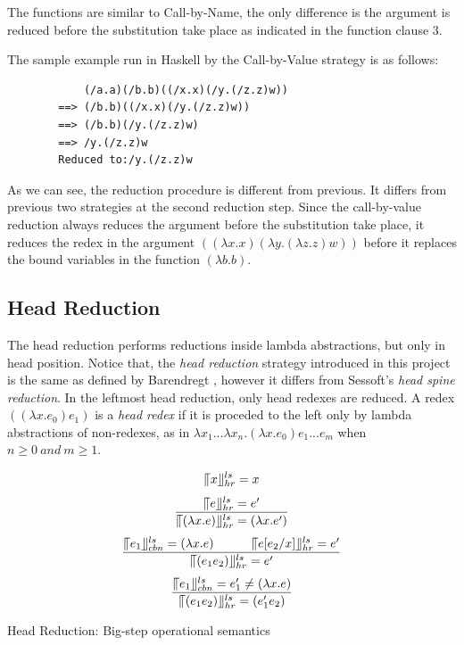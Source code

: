 \documentclass[a4paper,11pt,twoside]{report}
\begin{document}
The functions are similar to Call-by-Name, the only difference is the argument is reduced before the substitution take place as indicated in the function clause 3.

The sample example run in Haskell by the Call-by-Value strategy is as follows:

\begin{verbatim}
            (/a.a)(/b.b)((/x.x)(/y.(/z.z)w))
        ==> (/b.b)((/x.x)(/y.(/z.z)w))
        ==> (/b.b)(/y.(/z.z)w)
        ==> /y.(/z.z)w
        Reduced to:/y.(/z.z)w
\end{verbatim}

As we can see, the reduction procedure is different from previous. It differs from previous two strategies at the second reduction step. Since the call-by-value reduction always reduces the argument before the substitution take place, it reduces the redex in the argument $((\lambda x.x)(\lambda y.(\lambda z.z)w))$ before it replaces the bound variables in the function $(\lambda b.b)$.    


\subsection{Head Reduction}

The head reduction performs reductions inside lambda abstractions, but only in head position. Notice that, the \textit{head reduction} strategy introduced in this project is the same as defined by Barendregt \cite{barendregt1984lambda}, however it differs from Sessoft's \cite{sestoft2002demonstrating} \textit{head spine reduction}. In the leftmost head reduction, only head redexes are reduced. A redex $((\lambda x.e_0)e_1)$ is a \textit{head redex} if it is proceded to the left only by lambda abstractions of non-redexes, as in $\lambda x_1...\lambda x_n.(\lambda x.e_0)e_1...e_m$ when $n \geqslant 0\ and\ m \geqslant 1$.


\begin{equation*}
\llceil x \rrfloor ^{ls} _{hr} = x
\end{equation*}
\begin{equation*}
\frac{\llceil e \rrfloor ^{ls} _{hr} = e'}{\llceil (\lambda x.e) \rrfloor ^{ls} _{hr} = (\lambda x.e')}
\end{equation*}
\begin{equation*}
\frac{\llceil e_1 \rrfloor ^{ls} _{cbn} = (\lambda x.e)\ \ \ \ \ \ \ \ \ \llceil e[e_2/x] \rrfloor ^{ls} _{hr} = e'}{\llceil (e_1e_2) \rrfloor ^{ls} _{hr} = e'}
\end{equation*}
\begin{equation*}
\frac{\llceil e_1 \rrfloor ^{ls} _{cbn} = e'_1\neq (\lambda x.e)}{\llceil (e_1e_2) \rrfloor ^{ls} _{hr}  = (e'_1e_2)}
\end{equation*}
\begin{center}
Head Reduction: Big-step operational semantics
\end{center}
\end{document}
